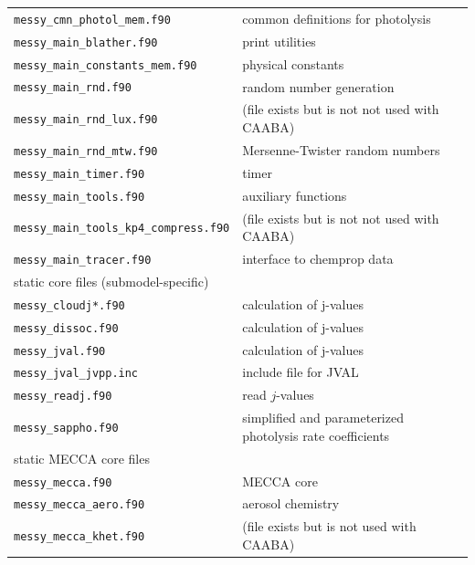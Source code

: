 \documentclass[a4paper,twoside]{article}
\newcommand{\IT}[1]{#1\index{#1}}
\begin{document}
\begin{table}
\begin{center}
\begin{tabular}{lp{}}
      \verb|messy_cmn_photol_mem.f90|          & common definitions for \IT{photolysis}\\
      \verb|messy_main_blather.f90|            & print utilities\\
      \verb|messy_main_constants_mem.f90|      & physical constants\\
      \verb|messy_main_rnd.f90|                & \IT{random number} generation\\
      \verb|messy_main_rnd_lux.f90|            & (file exists but is not not used with \IT{CAABA})\\
      \verb|messy_main_rnd_mtw.f90|            & \IT{Mersenne-Twister} \IT{random number}s\\
      \verb|messy_main_timer.f90|              & timer\\
      \verb|messy_main_tools.f90|              & auxiliary functions\\
      \verb|messy_main_tools_kp4_compress.f90| & (file exists but is not not used with \IT{CAABA})\\
      \verb|messy_main_tracer.f90|             & interface to chemprop data\\
      \hline
      \multicolumn{2}{l}{static core files (\IT{submodel}-specific)}\\
      \hline
      \verb|messy_cloudj*.f90|                 & calculation of \IT{j-values}\\
      \verb|messy_dissoc.f90|                  & calculation of \IT{j-values}\\
      \verb|messy_jval.f90|                    & calculation of \IT{j-values}\\
      \verb|messy_jval_jvpp.inc|               & include file for \IT{JVAL}\\
      \verb|messy_readj.f90|                   & read $j$-values\\
      \verb|messy_sappho.f90|                  & simplified and parameterized
                                                 \IT{photolysis} rate coefficients\\
      \hline
      \multicolumn{2}{l}{static \IT{MECCA} core files}\\
      \hline
      \verb|messy_mecca.f90|                   & \IT{MECCA} core\\
      \verb|messy_mecca_aero.f90|              & \IT{aerosol} \IT{chemistry}\\
      \verb|messy_mecca_khet.f90|              & (file exists but is not
                                                 used with \IT{CAABA})\\

\end{tabular}
\end{center}
\end{table}
\end{document}
